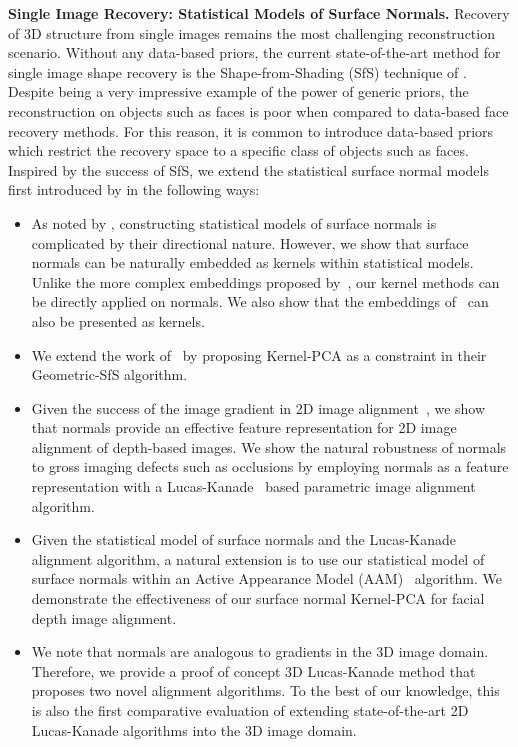 \textbf{Single Image Recovery: Statistical Models of Surface Normals.} Recovery
of 3D structure from single images remains the most challenging reconstruction
scenario. Without any data-based priors, the current state-of-the-art method
for single image shape recovery is the Shape-from-Shading (SfS) technique
of \citet{barron2015shape}. Despite being a very impressive example of the power
of generic priors, the reconstruction on objects such as faces is poor when 
compared to data-based face recovery methods. For this reason, it is common
to introduce data-based priors which restrict the recovery space to a specific
class of objects such as faces. Inspired by the success of SfS, we extend
the statistical surface normal models first introduced by 
\citet{smith2006recovering,smith2008facial} in the following ways:
\begin{itemize}
	\item As noted by \citet{smith2006recovering,smith2008facial}, constructing
		  statistical models of surface normals is complicated by their
		  directional nature. However, we show that surface normals can be 
		  naturally embedded as kernels within statistical models. Unlike
		  the more complex embeddings proposed by~\cite{smith2006recovering,smith2008facial}, 
		  our kernel methods can be directly applied on normals. We also show
		  that the embeddings of~\cite{smith2006recovering,smith2008facial} 
		  can also be presented as kernels.
    \item We extend the work of~\cite{smith2006recovering,smith2008facial}
          by proposing Kernel-PCA as a constraint in their Geometric-SfS 
          algorithm.
    \item Given the success of the image gradient in 2D image alignment~\cite{tzimiropoulos2011robust,cootes2001representing},
          we show that normals provide an effective feature representation
          for 2D image alignment of depth-based images. We show the natural
          robustness of normals to gross imaging defects such as occlusions
          by employing normals as a feature representation with a Lucas-Kanade~\cite{lucas1981iterative,baker2004lucas}
          based parametric image alignment algorithm.
    \item Given the statistical model of surface normals and the Lucas-Kanade
          alignment algorithm, a natural extension is to use our statistical
          model of surface normals within an Active Appearance Model (AAM)~\cite{cootes2001active,matthews2004active} 
          algorithm. We demonstrate the effectiveness of our surface normal 
          Kernel-PCA for facial depth image alignment.
    \item We note that normals are analogous to gradients in the 3D image 
          domain. Therefore, we provide a proof of concept 3D Lucas-Kanade
          method that proposes two novel alignment algorithms. To the best of
          our knowledge, this is also the first comparative evaluation of
          extending state-of-the-art 2D Lucas-Kanade algorithms into the 3D
          image domain.
\end{itemize}

